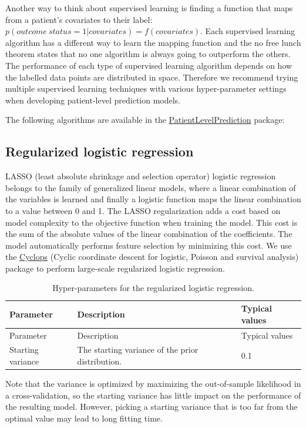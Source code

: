 \documentclass[11pt]{book}
\theoremstyle{definition}
\theoremstyle{definition}
\theoremstyle{definition}
\theoremstyle{remark}
\begin{document}
Another way to think about supervised learning is finding a function that maps from a patient's covariates to their label: \(p(outcome\ status = 1|covariates) = f(covariates)\). Each supervised learning algorithm has a different way to learn the mapping function and the no free lunch theorem states that no one algorithm is always going to outperform the others. The performance of each type of supervised learning algorithm depends on how the labelled data points are distributed in space. Therefore we recommend trying multiple supervised learning techniques with various hyper-parameter settings when developing patient-level prediction models.

The following algorithms are available in the \href{https://ohdsi.github.io/PatientLevelPrediction/}{PatientLevelPrediction} package:

\hypertarget{regularized-logistic-regression}{%
\subsection{Regularized logistic regression}\label{regularized-logistic-regression}}

LASSO (least absolute shrinkage and selection operator) logistic regression belongs to the family of generalized linear models, where a linear combination of the variables is learned and finally a logistic function maps the linear combination to a value between 0 and 1. The LASSO regularization adds a cost based on model complexity to the objective function when training the model. This cost is the sum of the absolute values of the linear combination of the coefficients. The model automatically performs feature selection by minimizing this cost. We use the \href{https://ohdsi.github.io/Cyclops/}{Cyclops} (Cyclic coordinate descent for logistic, Poisson and survival analysis) package to perform large-scale regularized logistic regression.

\begin{longtable}[]{@{}lll@{}}
\caption{\label{tab:lassoParameters} Hyper-parameters for the regularized logistic regression.}\tabularnewline
\toprule
Parameter & Description & Typical values\tabularnewline
\midrule
\endfirsthead
\toprule
Parameter & Description & Typical values\tabularnewline
\midrule
\endhead
Starting variance & The starting variance of the prior distribution. & 0.1\tabularnewline
\bottomrule
\end{longtable}

Note that the variance is optimized by maximizing the out-of-sample likelihood in a cross-validation, so the starting variance has little impact on the performance of the resulting model. However, picking a starting variance that is too far from the optimal value may lead to long fitting time.
\end{document}
